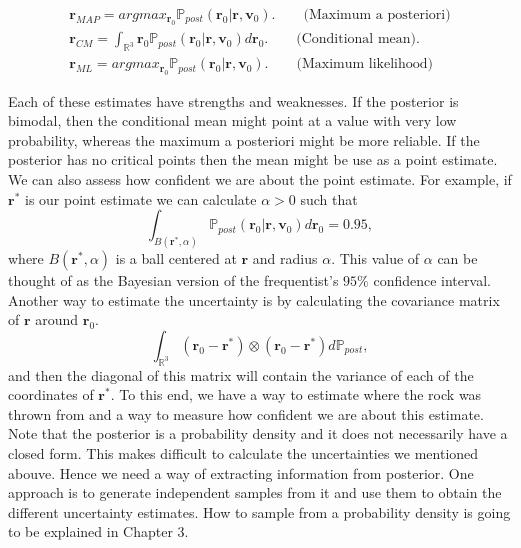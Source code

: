 \documentclass[12pt]{book}
\newcommand{\post}{\mathbb{P}_{post}}
\begin{document}
%
%
\begin{eqnarray}\label{eqnpointestimates}
\textbf{r}_{MAP}=argmax_{\textbf{r}_{0}}\post(\textbf{r}_{0}|\textbf{r},\textbf{v}_{0}). 
\qquad\text{(Maximum a posteriori)}\\
\textbf{r}_{CM}=\int_{\mathbb{R}^{3}}\textbf{r}_{0}\post(\textbf{r}_{0}|\textbf{r},\textbf{v}_{0})d\textbf{r}_{0}.
\qquad\text{(Conditional mean)}. \\
\textbf{r}_{ML}=argmax_{\textbf{r}_{0}}\post(\textbf{r}_{0}|\textbf{r},\textbf{v}_{0}).
\qquad\text{(Maximum likelihood)}
\end{eqnarray}

Each  of these estimates have strengths and weaknesses. If the posterior is bimodal, then the conditional
mean might point at a value with very low probability, whereas the maximum a posteriori might be more 
reliable. If the posterior has no critical points then the mean might be use as a point estimate. We can 
also assess how confident we are about the point estimate. For example, if $\textbf{r}^{*}$ is our point
estimate we can calculate $\alpha>0$ such that
\begin{equation*}
\int_{B(\textbf{r}^{*},\alpha)}\post(\textbf{r}_{0}|\textbf{r},\textbf{v}_{0})d\textbf{r}_{0}=0.95,
\end{equation*}
where $B(\textbf{r}^{*},\alpha)$ is a ball centered at $\textbf{r}$ and radius $\alpha$. This 
value of $\alpha$ can be thought of as  the Bayesian version 
of the frequentist's $95\%$ confidence interval.
Another way to estimate the uncertainty is by calculating the covariance matrix of $\textbf{r}$
around $\textbf{r}_{0}$.
\begin{equation*}
\int_{\mathbb{R}^{3}}(\textbf{r}_{0}-\textbf{r}^{*})\otimes(\textbf{r}_{0}-\textbf{r}^{*})d\post,
\end{equation*}
\newline
and then the diagonal of this matrix will  contain the variance of each of the coordinates of $\textbf{r}^{*}$.
To this end, we have a way to estimate where the rock was thrown from and a way to measure how
confident we are about this estimate. 
Note that the posterior is a probability density and it does not necessarily have a closed form. This
makes difficult to calculate the uncertainties we mentioned abouve.
Hence we need a way of extracting information from posterior. One approach is to generate independent samples
from it and use them to obtain the different uncertainty estimates. How to sample from a probability 
density is going to be explained in Chapter 3.  
\newline
\end{document}
